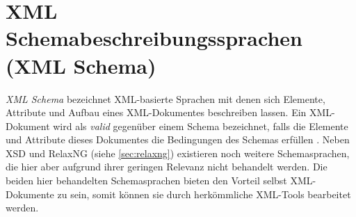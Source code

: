 \section{XML Schemabeschreibungssprachen (XML Schema)}
\label{sec:xmlschema}

\emph{XML Schema} bezeichnet XML-basierte Sprachen mit denen sich Elemente, Attribute und Aufbau eines XML-Dokumentes beschreiben lassen. 
Ein XML-Dokument wird als \emph{valid} gegenüber einem Schema bezeichnet, falls die Elemente und Attribute dieses Dokumentes die Bedingungen des Schemas erfüllen \cite{taxonomyXMLSchema}.
Neben XSD und RelaxNG (siehe \cref{sec:relaxng}) existieren noch weitere Schemasprachen, die hier aber aufgrund ihrer geringen Relevanz nicht behandelt werden. Die beiden hier behandelten Schemasprachen bieten den Vorteil selbst XML-Dokumente zu sein, somit können sie durch herkömmliche XML-Tools bearbeitet werden.



